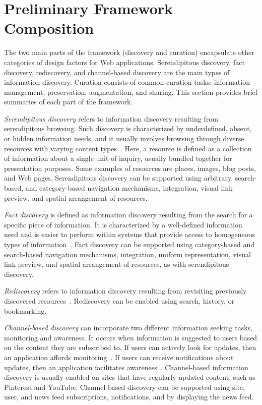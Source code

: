 {\section{Preliminary Framework Composition}
The two main parts of the framework (discovery and curation) encapsulate other categories of design factors for Web applications. Serendipitous discovery, fact discovery, rediscovery, and channel-based discovery are the main types of information discovery. Curation consists of common curation tasks: information management, preservation, augmentation, and sharing. This section provides brief summaries of each part of the framework.

\textit{Serendipitous discovery} refers to information discovery resulting from serendipitous browsing. Such discovery is characterized by underdefined, absent, or hidden information needs, and it usually involves browsing through diverse resources with varying content types~\cite{kellar2006goal, kellar2007field}. Here, a resource is defined as a collection of information about a single unit of inquiry, usually bundled together for presentation purposes. Some examples of resources are places, images, blog posts, and Web pages. Serendipitous discovery can be supported using arbitrary, search-based, and category-based navigation mechanisms, integration, visual link preview, and spatial arrangement of resources.

\textit{Fact discovery} is defined as information discovery resulting from the search for a specific piece of information. It is characterized by a well-defined information need and is easier to perform within systems that provide access to homogeneous types of information~\cite{kellar2006goal, lindley2012s}. Fact discovery can be supported using category-based and search-based navigation mechanisms, integration, uniform representation, visual link preview, and spatial arrangement of resources, as with serendipitous discovery. 

\textit{Rediscovery} refers to information discovery resulting from revisiting previously discovered resources~\cite{tauscher1997people}. Rediscovery can be enabled using search, history, or bookmarking.

\textit{Channel-based discovery} can incorporate two different information seeking tasks, monitoring and awareness. It occurs when information is suggested to users based on the content they are subscribed to. If users can actively look for updates, then an application affords monitoring~\cite{morrison2001taxonomic}. If users can receive notifications about updates, then an application facilitates awareness~\cite{bates1986exploratory,bates2002toward}. Channel-based information discovery is usually enabled on sites that have regularly updated content, such as Pinterest and YouTube. Channel-based discovery can be supported using site, user, and news feed subscriptions, notifications, and by displaying the news feed.   

}

